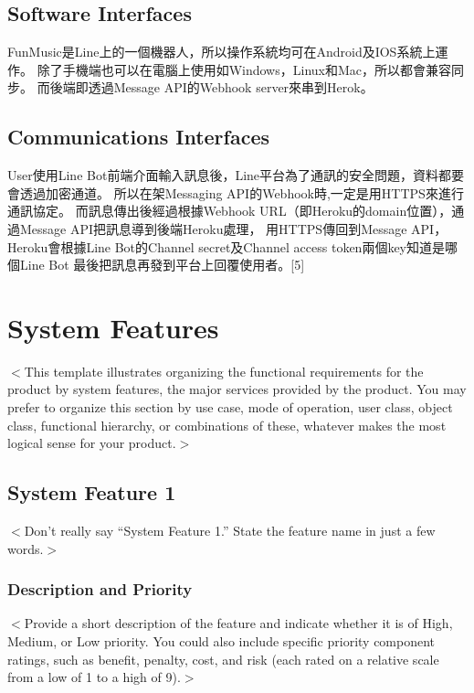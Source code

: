 \documentclass{scrreprt}
\begin{document}
\section{Software Interfaces}
\begin{CJK}{UTF8}{<font>}
FunMusic是Line上的一個機器人，所以操作系統均可在Android及IOS系統上運作。
除了手機端也可以在電腦上使用如Windows，Linux和Mac，所以都會兼容同步。
而後端即透過Message API的Webhook server來串到Herok。
\end{CJK}

\section{Communications Interfaces}
\begin{CJK}{UTF8}{<font>}
User使用Line Bot前端介面輸入訊息後，Line平台為了通訊的安全問題，資料都要會透過加密通道。
所以在架Messaging API的Webhook時,一定是用HTTPS來進行通訊協定。
而訊息傳出後經過根據Webhook URL（即Heroku的domain位置），通過Message API把訊息導到後端Heroku處理，
用HTTPS傳回到Message API，Heroku會根據Line Bot的Channel secret及Channel access token兩個key知道是哪個Line Bot
最後把訊息再發到平台上回覆使用者。[5]
\end{CJK}


\chapter{System Features}
\begin{CJK}{UTF8}{<font>}
$<$This template illustrates organizing the functional requirements for the 
product by system features, the major services provided by the product. You may 
prefer to organize this section by use case, mode of operation, user class, 
object class, functional hierarchy, or combinations of these, whatever makes the 
most logical sense for your product.$>$
\end{CJK}

\section{System Feature 1}
$<$Don’t really say “System Feature 1.” State the feature name in just a few 
words.$>$

\subsection{Description and Priority}
\begin{CJK}{UTF8}{<font>}
$<$Provide a short description of the feature and indicate whether it is of 
High, Medium, or Low priority. You could also include specific priority 
component ratings, such as benefit, penalty, cost, and risk (each rated on a 
relative scale from a low of 1 to a high of 9).$>$
\end{CJK}
\end{document}
